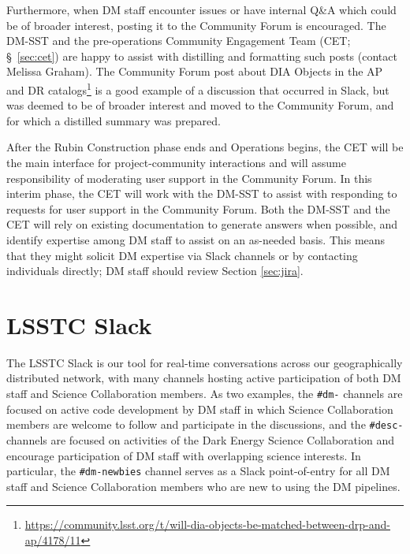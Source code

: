 \documentclass[DM,lsstdraft,authoryear,toc]{lsstdoc}
\begin{document}
Furthermore, when DM staff encounter issues or have internal Q\&A which could be of broader interest, posting it to the Community Forum is encouraged.
The DM-SST and the pre-operations Community Engagement Team (CET; \S~\ref{sec:cet}) are happy to assist with distilling and formatting such posts (contact Melissa Graham).
The Community Forum post about DIA Objects in the AP and DR catalogs\footnote{\url{https://community.lsst.org/t/will-dia-objects-be-matched-between-drp-and-ap/4178/11}} is a good example of a discussion that occurred in Slack, but was deemed to be of broader interest and moved to the Community Forum, and for which a distilled summary was prepared.

After the Rubin Construction phase ends and Operations begins, the CET will be the main interface for project-community interactions and will assume responsibility of moderating user support in the Community Forum.
In this interim phase, the CET will work with the DM-SST to assist with responding to requests for user support in the Community Forum.
Both the DM-SST and the CET will rely on existing documentation to generate answers when possible, and identify expertise among DM staff to assist on an as-needed basis.
This means that they might solicit DM expertise via Slack channels or by contacting individuals directly; DM staff should review Section \ref{sec:jira}.

\section{LSSTC Slack}\label{sec:slack}

The LSSTC Slack is our tool for real-time conversations across our geographically distributed network, with many channels hosting active participation of both DM staff and Science Collaboration members.
As two examples, the {\tt \#dm-} channels are focused on active code development by DM staff in which Science Collaboration members are welcome to follow and participate in the discussions, and the {\tt \#desc-} channels are focused on activities of the Dark Energy Science Collaboration and encourage participation of DM staff with overlapping science interests.
In particular, the {\tt \#dm-newbies} channel serves as a Slack point-of-entry for all DM staff and Science Collaboration members who are new to using the DM pipelines.
\end{document}
